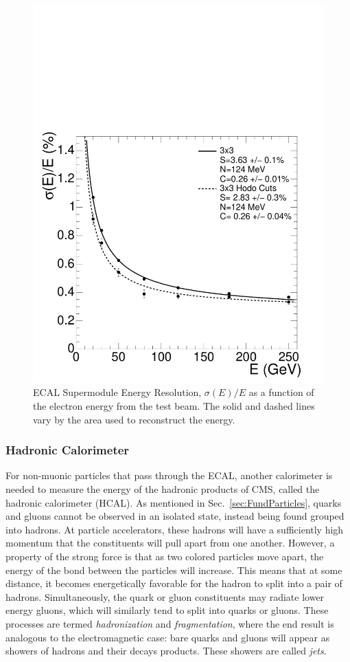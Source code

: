 \begin{figure}[htbp]
\begin{center}
\includegraphics[width=.7\linewidth]{Experiment/figures/ECALResolution.pdf}
\caption[Resolution of the Electromagnetic Calorimeter as a Function of Energy]{ECAL Supermodule Energy Resolution, $\sigma(E)/E$ as a function of the electron energy from the test beam. The solid and dashed lines vary by the area used to reconstruct the energy.}
\label{fig:ECALResolution}
\end{center}
\end{figure}

\subsubsection{Hadronic Calorimeter}
\label{sec:HadrCalo}

For non-muonic particles that pass through the ECAL, another calorimeter is needed to measure the energy of the hadronic products of CMS, called the hadronic calorimeter (HCAL). As mentioned in Sec.~\ref{sec:FundParticles}, quarks and gluons cannot be observed in an isolated state, instead being found grouped into hadrons. At particle accelerators, these hadrons will have a sufficiently high momentum that the constituents will pull apart from one another. However, a property of the strong force is that as two colored particles move apart, the energy of the bond between the particles will increase. This means that at some distance, it becomes energetically favorable for the hadron to split into a pair of hadrons. Simultaneously, the quark or gluon constituents may radiate lower energy gluons, which will similarly tend to split into quarks or gluons. These processes are termed \textit{hadronization} and \textit{fragmentation}, where the end result is analogous to the electromagnetic case: bare quarks and gluons will appear as showers of hadrons and their decays products. These showers are called \textit{jets}.

